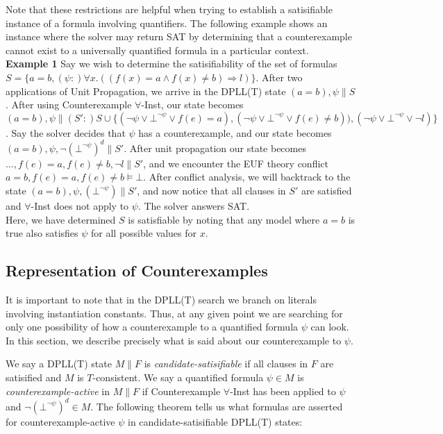 \documentclass{llncs}
\begin{document}
Note that these restrictions are helpful when trying to establish a satisifiable instance of a formula involving quantifiers.
The following example shows an instance where the solver may return SAT by determining that a counterexample cannot exist to a universally quantified formula in a particular context. \\

{\bf Example 1}
Say we wish to determine the satisifiability of the set of formulas $S = \{ a = b, (\psi :) \forall x. ((f(x) = a \wedge f(x) \neq b) \Rightarrow l) \}$.
After two applications of Unit Propagation, we arrive in the DPLL(T) state $( a = b ), \psi \parallel S$.
After using Counterexample $\forall$-Inst, our state becomes $( a = b ), \psi \parallel (S':) S \cup \{ (\neg \psi \vee \bot^{\neg \psi} \vee f( e ) = a), (\neg \psi \vee \bot^{\neg \psi} \vee f( e ) \neq b)), (\neg \psi \vee \bot^{\neg \psi} \vee \neg l) \}$.
Say the solver decides that $\psi$ has a counterexample, and our state becomes $( a = b ), \psi, \neg (\bot^{\neg \psi})^d \parallel S'$. 
After unit propagation our state becomes $\ldots, f( e ) = a, f( e ) \neq b, \neg l \parallel S'$, and we encounter the EUF theory conflict $a = b, f( e ) = a, f( e ) \neq b \models \bot$.
After conflict analysis, we will backtrack to the state $( a = b ), \psi, (\bot^{\neg \psi}) \parallel S'$, and now notice that all clauses in $S'$ are satisfied and $\forall$-Inst does not apply to $\psi$.
The solver answers SAT. \\

Here, we have determined $S$ is satisfiable by noting that any model where $a = b$ is true also satisfies $\psi$ for all possible values for $x$.


\subsection{Representation of Counterexamples}

It is important to note that in the DPLL(T) search we branch on literals involving instantiation constants.
Thus, at any given point we are searching for only one possibility of how a counterexample to a quantified formula $\psi$ can look.
In this section, we describe precisely what is said about our counterexample to $\psi$.

We say a DPLL(T) state $M \parallel F$ is \emph{candidate-satisifiable} if all clauses in $F$ are satisified and $M$ is $T$-consistent.
We say a quantified formula $\psi \in M$ is \emph{counterexample-active} in $M \parallel F$ if Counterexample $\forall$-Inst has been applied to $\psi$ and $\neg (\bot^{\neg \psi})^d \in M$.
The following theorem tells us what formulas are asserted for counterexample-active $\psi$ in candidate-satisifiable DPLL(T) states:
\end{document}
